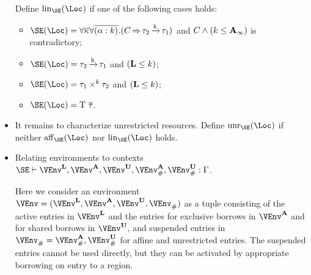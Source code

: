 \begin{itemize}
Define  $\Linear\SE\Loc$ if one of the following cases holds:
\begin{itemize}
\item $\SE (\Loc) =
  \forall\Multi\kvar\forall\Multi{\bvar{\tvar}{k}}.(\qual{C}{\tau_2\tarr{k}\tau_1})$
  and $C \wedge (k \leq \mathbf{A}_\infty)$ is contradictory;
\item $\SE (\Loc) = \tau_2\tarr{k}{\tau_1}$ and $(\mathbf{L} \leq k)$;
\item $\SE (\Loc) = \tyPair[k]{\tau_1}{\tau_2}$ and $(\mathbf{L} \leq k)$;
\item $\SE (\Loc) = \tapp{\tcon}{\Multi\tau}$.
\end{itemize}
\item
It remains to characterize unrestricted resources.
Define $\Unrestricted\SE\Loc$ if neither $\Affine\SE\Loc$ nor
$\Linear\SE\Loc$ holds.
\item
  Relating environments to contexts\\
  $\SE \vdash \Active\VEnv, \MutableBorrows\VEnv,
\ImmutableBorrows\VEnv, \Suspended[\kaff]\VEnv, \Suspended[\kun]\VEnv : \E$.

Here we consider an
environment $\VEnv = (\Active\VEnv, \MutableBorrows\VEnv,
\ImmutableBorrows\VEnv, \Suspended\VEnv)$ as a tuple
consisting of the active entries in $\Active\VEnv$ and the
entries for exclusive borrows in $\MutableBorrows\VEnv$ and for
shared borrows in $\ImmutableBorrows\VEnv$, and suspended entries
in $\Suspended\VEnv = \Suspended[\kaff]\VEnv, \Suspended[\kun]\VEnv$
for affine and unrestricted entries. The
suspended entries cannot be used directly, but they can be activated
by appropriate borrowing on entry to a region.
\end{itemize}


